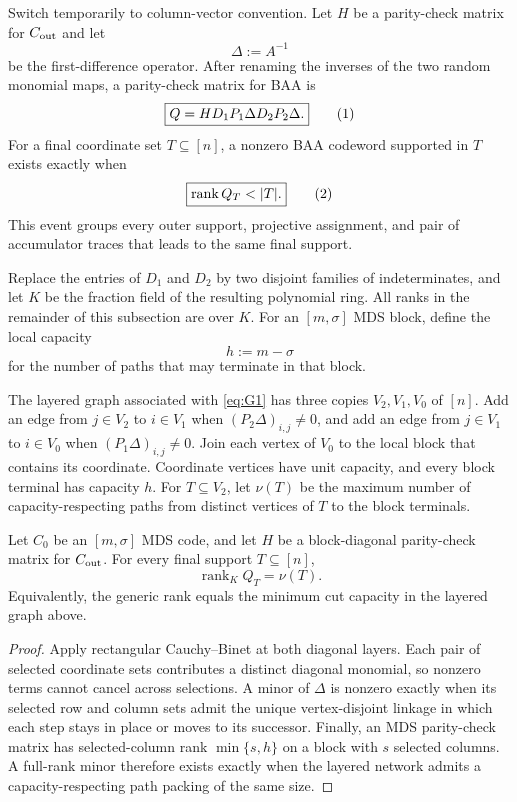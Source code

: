 \documentclass[runningheads,envcountsame,envcountsect]{llncs}
\newcommand{\eqnumlabel}[1]{%
  \refstepcounter{equation}\tag{\theequation}\label{#1}%
}
\begin{document}
Switch temporarily to column-vector convention.  Let $H$ be a parity-check
matrix for $C_{\rm out}$ and let
\[
    \Delta:=A^{-1}
\]
be the first-difference operator.  After renaming the inverses of the two random
monomial maps, a parity-check matrix for BAA is
\[
    \boxed{
    Q=H D_1P_1\Delta D_2P_2\Delta .
    }
    \eqnumlabel{eq:G1}
\]
For a final coordinate set $T\subseteq[n]$, a nonzero BAA codeword supported in
$T$ exists exactly when
\[
    \boxed{\operatorname{rank}Q_T<|T|.}
    \eqnumlabel{eq:G2}
\]
This event groups every outer support, projective assignment, and pair of
accumulator traces that leads to the same final support.

Replace the entries of $D_1$ and $D_2$ by two disjoint families of
indeterminates, and let $K$ be the fraction field of the resulting polynomial
ring.  All ranks in the remainder of this subsection are over $K$.  For an
$[m,\sigma]$ MDS block, define the local capacity
\[
    h:=m-\sigma
\]
for the number of paths that may terminate in that block.

The layered graph associated with \eqref{eq:G1} has three copies $V_2,V_1,V_0$ of
$[n]$.  Add an edge from $j\in V_2$ to $i\in V_1$ when
$(P_2\Delta)_{i,j}\ne0$, and add an edge from $j\in V_1$ to $i\in V_0$ when
$(P_1\Delta)_{i,j}\ne0$.  Join each vertex of $V_0$ to the local block that
contains its coordinate.  Coordinate vertices have unit capacity, and every
block terminal has capacity $h$.  For $T\subseteq V_2$, let $\nu(T)$ be the
maximum number of capacity-respecting paths from distinct vertices of $T$ to
the block terminals.

\begin{theorem}
Let $C_0$ be an $[m,\sigma]$ MDS code, and let $H$ be a block-diagonal parity-check
matrix for $C_{\rm out}$.  For every final support $T\subseteq[n]$,
\[
    \operatorname{rank}_K Q_T=\nu(T).
\]
Equivalently, the generic rank equals the minimum cut capacity in the layered
graph above.
\end{theorem}

\begin{proof}
Apply rectangular Cauchy--Binet at both diagonal layers.  Each pair of selected
coordinate sets contributes a distinct diagonal monomial, so nonzero terms
cannot cancel across selections.  A minor of $\Delta$ is nonzero exactly when
its selected row and column sets admit the unique vertex-disjoint linkage in
which each step stays in place or moves to its successor.  Finally, an MDS
parity-check matrix has selected-column rank $\min\{s,h\}$ on a block with $s$
selected columns.  A full-rank minor therefore exists exactly when the layered
network admits a capacity-respecting path packing of the same size.
\end{proof}
\end{document}
